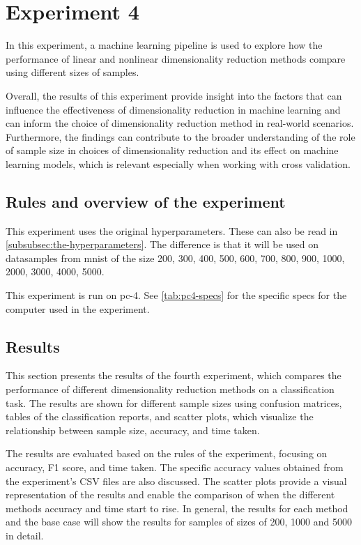 \section{Experiment 4}\label{sec:experiment-4}

In this experiment, a machine learning pipeline is used to explore how the performance of linear and nonlinear dimensionality reduction methods compare using different sizes of samples.

Overall, the results of this experiment provide insight into the factors that can influence the effectiveness of dimensionality reduction in machine learning and can inform the choice of dimensionality reduction method in real-world scenarios. Furthermore, the findings can contribute to the broader understanding of the role of sample size in choices of dimensionality reduction and its effect on machine learning models, which is relevant especially when working with cross validation.

\subsection{Rules and overview of the experiment}
This experiment uses the original hyperparameters. These can also be read in \autoref{subsubsec:the-hyperparameters}. The difference is that it will be used on datasamples from \gls{mnist} of the size 200, 300, 400, 500, 600, 700, 800, 900, 1000, 2000, 3000, 4000, 5000.

This experiment is run on pc-4. See \autoref{tab:pc4-specs} for the specific specs for the computer used in the experiment.


\subsection{Results}\label{subsec:experiment_4_results}
This section presents the results of the fourth experiment, which compares the performance of different dimensionality reduction methods on a classification task. The results are shown for different sample sizes using confusion matrices, tables of the classification reports, and scatter plots, which visualize the relationship between sample size, accuracy, and time taken.

The results are evaluated based on the rules of the experiment, focusing on accuracy, F1 score, and time taken. The specific accuracy values obtained from the experiment's CSV files are also discussed. The scatter plots provide a visual representation of the results and enable the comparison of when the different methods accuracy and time start to rise. In general, the results for each method and the base case will show the results for samples of sizes of 200, 1000 and 5000 in detail.

